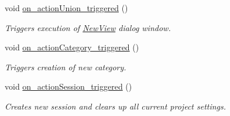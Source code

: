 \begin{DoxyCompactItemize}
void \hyperlink{classMainWindow_ab7c8299c50bb97eaedcb225e90f9bcf4}{on\-\_\-action\-Union\-\_\-triggered} ()
\begin{DoxyCompactList}\small\item\em Triggers execution of \hyperlink{classNewView}{New\-View} dialog window. \end{DoxyCompactList}\item 
void \hyperlink{classMainWindow_a2812d2f0350ea5a0da583953fa25b19f}{on\-\_\-action\-Category\-\_\-triggered} ()
\begin{DoxyCompactList}\small\item\em Triggers creation of new category. \end{DoxyCompactList}\item 
void \hyperlink{classMainWindow_a541e1460680230409808d47585c4b8b4}{on\-\_\-action\-Session\-\_\-triggered} ()
\begin{DoxyCompactList}\small\item\em Creates new session and clears up all current project settings. \end{DoxyCompactList}\end{DoxyCompactItemize}
